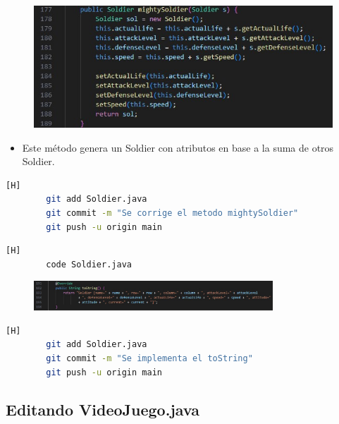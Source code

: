 \documentclass{article}
\begin{document}
	\begin{figure}[H]
		\centering
		\includegraphics[width=1\textwidth,keepaspectratio]{img/mightySoldier.jpg}
	\end{figure}
	
	\begin{itemize}	
		\item Este método genera un Soldier con atributos en base a la suma de otros Soldier.
	\end{itemize}
	
	
	\begin{lstlisting}[language=bash,caption={Commit: f813202b9c72f5cefe894fcf22abc6c6f57a3a14}][H]
		git add Soldier.java
		git commit -m "Se corrige el metodo mightySoldier"			
		git push -u origin main
	\end{lstlisting}
	
	
	\begin{lstlisting}[language=bash,caption={Se implementa el método toString}][H]
		code Soldier.java
	\end{lstlisting}
	
	\begin{figure}[H]
		\centering
		\includegraphics[width=0.8\textwidth,keepaspectratio]{img/toString.jpg}
	\end{figure}
	
	\begin{lstlisting}[language=bash,caption={Commit: 256779ffb9e686cb971dc63fb7c6ac7fadf36ee1}][H]
		git add Soldier.java
		git commit -m "Se implementa el toString"			
		git push -u origin main
	\end{lstlisting}

	\subsection{Editando VideoJuego.java}
	
\end{document}
